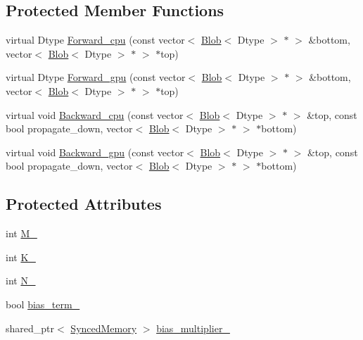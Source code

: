 \subsection*{Protected Member Functions}
\begin{DoxyCompactItemize}
\item 
virtual Dtype \hyperlink{classcaffe_1_1_inner_product_layer_afa97ce030d4fec47cca1bd758bc446f3}{Forward\+\_\+cpu} (const vector$<$ \hyperlink{classcaffe_1_1_blob}{Blob}$<$ Dtype $>$ $\ast$ $>$ \&bottom, vector$<$ \hyperlink{classcaffe_1_1_blob}{Blob}$<$ Dtype $>$ $\ast$ $>$ $\ast$top)
\item 
virtual Dtype \hyperlink{classcaffe_1_1_inner_product_layer_a309180d8bbea21a281de52f3465ea786}{Forward\+\_\+gpu} (const vector$<$ \hyperlink{classcaffe_1_1_blob}{Blob}$<$ Dtype $>$ $\ast$ $>$ \&bottom, vector$<$ \hyperlink{classcaffe_1_1_blob}{Blob}$<$ Dtype $>$ $\ast$ $>$ $\ast$top)
\item 
virtual void \hyperlink{classcaffe_1_1_inner_product_layer_ab4f9892f3be7aef5d98777bca2dd8598}{Backward\+\_\+cpu} (const vector$<$ \hyperlink{classcaffe_1_1_blob}{Blob}$<$ Dtype $>$ $\ast$ $>$ \&top, const bool propagate\+\_\+down, vector$<$ \hyperlink{classcaffe_1_1_blob}{Blob}$<$ Dtype $>$ $\ast$ $>$ $\ast$bottom)
\item 
virtual void \hyperlink{classcaffe_1_1_inner_product_layer_a67252d33aaf6efb6ef5ce2e450cc4ca8}{Backward\+\_\+gpu} (const vector$<$ \hyperlink{classcaffe_1_1_blob}{Blob}$<$ Dtype $>$ $\ast$ $>$ \&top, const bool propagate\+\_\+down, vector$<$ \hyperlink{classcaffe_1_1_blob}{Blob}$<$ Dtype $>$ $\ast$ $>$ $\ast$bottom)
\end{DoxyCompactItemize}
\subsection*{Protected Attributes}
\begin{DoxyCompactItemize}
\item 
int \hyperlink{classcaffe_1_1_inner_product_layer_a7cfcde40b118c74a0e85aa3b58e8aa07}{M\+\_\+}
\item 
int \hyperlink{classcaffe_1_1_inner_product_layer_ad5a55ef3cb96a332977930cfaa700c66}{K\+\_\+}
\item 
int \hyperlink{classcaffe_1_1_inner_product_layer_a863f699772bf8b8d978d6ec8bca42463}{N\+\_\+}
\item 
bool \hyperlink{classcaffe_1_1_inner_product_layer_a7193d161e30f35b3f6d23293480eb683}{bias\+\_\+term\+\_\+}
\item 
shared\+\_\+ptr$<$ \hyperlink{classcaffe_1_1_synced_memory}{Synced\+Memory} $>$ \hyperlink{classcaffe_1_1_inner_product_layer_a2d7ebfa9183f4e4bdf9546965c3cc0a8}{bias\+\_\+multiplier\+\_\+}
\end{DoxyCompactItemize}


